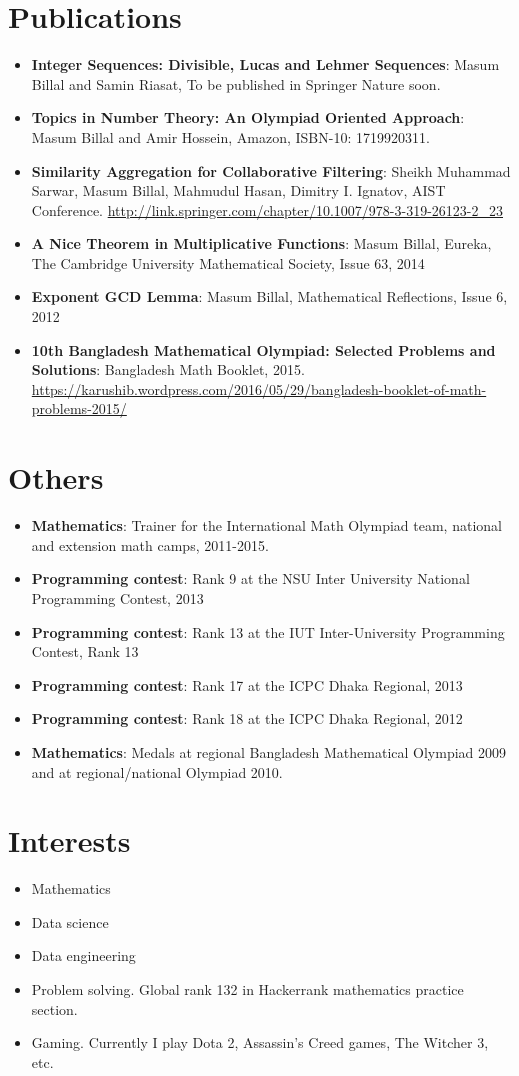 \documentclass[letterpaper,11pt]{article}
\makeatletter
\newcommand{\resumeItem}[2]{
	\item\small{
		\textbf{#1}{: #2 \vspace{-2pt}}
	}
}
\newcommand{\resumeSubheading}[4]{
	\vspace{-1pt}\item
	\begin{tabular*}{0.97\textwidth}{l@{\extracolsep{\fill}}r}
		\textbf{#1} & #2 \\
		\textit{\small#3} & \textit{\small #4} \\
	\end{tabular*}\vspace{-5pt}
}
\newcommand{\resumeSubItem}[2]{\resumeItem{#1}{#2}\vspace{-4pt}}
\newcommand{\resumeSubHeadingListStart}{\begin{itemize}[leftmargin=*]}
\newcommand{\resumeSubHeadingListEnd}{\end{itemize}}
\newcommand{\resumeItemListEnd}{\end{itemize}\vspace{-5pt}}
\makeatother
\begin{document}
	\section{Publications}
	\resumeSubHeadingListStart
	\resumeSubItem{Integer Sequences: Divisible, Lucas and Lehmer Sequences}{Masum Billal and Samin Riasat, To be published in Springer Nature soon.}
	\resumeSubItem{Topics in Number Theory: An Olympiad Oriented Approach}{Masum Billal and Amir Hossein, Amazon, ISBN-10: 1719920311.}
	\resumeSubItem{Similarity Aggregation for Collaborative Filtering}{Sheikh
		Muhammad Sarwar, Masum Billal, Mahmudul Hasan, Dimitry I. Ignatov, AIST Conference. \url{http://link.springer.com/chapter/10.1007/978-3-319-26123-2_23}}
	\resumeSubItem{A Nice Theorem in Multiplicative Functions}{Masum Billal, Eureka, The Cambridge University Mathematical Society, Issue 63, 2014}
	\resumeSubItem{Exponent GCD Lemma}{Masum Billal, Mathematical Reflections, Issue 6, 2012}
	\resumeSubItem{10th Bangladesh Mathematical Olympiad: Selected Problems and Solutions}{Bangladesh Math Booklet, 2015. \url{https://karushib.wordpress.com/2016/05/29/bangladesh-booklet-of-math-problems-2015/}}
	\resumeItemListEnd


	\section{Others}
	\resumeSubHeadingListStart
	\resumeSubItem{Mathematics}{Trainer for the International Math Olympiad team, national and extension math camps, 2011-2015.}
	\resumeSubItem{Programming contest}{Rank 9 at the NSU Inter University National Programming Contest, 2013}
	\resumeSubItem{Programming contest}{Rank 13 at the IUT Inter-University Programming Contest, Rank 13}
	\resumeSubItem{Programming contest}{Rank 17 at the ICPC Dhaka Regional, 2013}
	\resumeSubItem{Programming contest}{Rank 18 at the ICPC Dhaka Regional, 2012}
	\resumeSubItem{Mathematics}{Medals at regional Bangladesh Mathematical Olympiad 2009 and at regional/national Olympiad 2010.}
	\resumeSubHeadingListEnd
	\section{Interests}
	\resumeSubHeadingListStart
	\item{Mathematics}
	\item{Data science}
	\item{Data engineering}
	\item{Problem solving. Global rank 132 in Hackerrank mathematics practice section.}
	\item{Gaming. Currently I play Dota 2, Assassin's Creed games, The Witcher 3, etc.}
	\resumeSubHeadingListEnd
\end{document}

